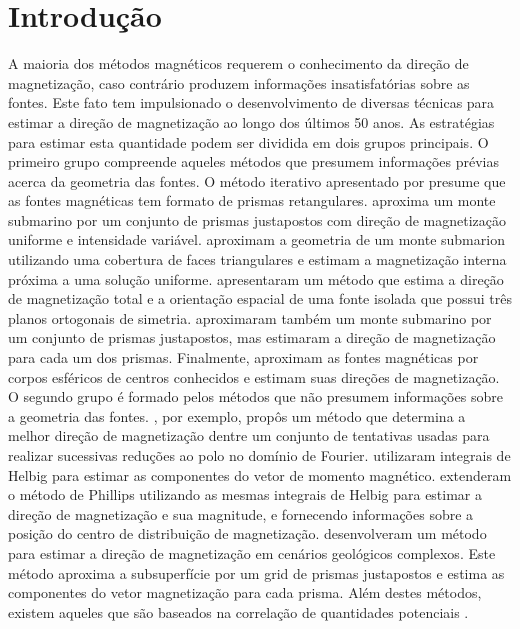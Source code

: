 \chapter{Introdução}
\label{chap:introducao}

A maioria dos métodos magnéticos requerem o conhecimento da direção de magnetização, caso contrário produzem informações insatisfatórias sobre as fontes. Este fato tem impulsionado o desenvolvimento de diversas técnicas para estimar a direção de magnetização ao longo dos últimos 50 anos. As estratégias para estimar esta quantidade podem ser dividida em dois grupos principais. O primeiro grupo compreende aqueles métodos que presumem informações prévias acerca da geometria das fontes. O método iterativo apresentado por \cite{bhattacharyya1966} presume que as fontes magnéticas tem formato de prismas retangulares. \cite{emilia_massey_1974} aproxima um monte submarino por um conjunto de prismas justapostos com direção de magnetização uniforme e intensidade variável. \cite{parker_etal_1987} aproximam a geometria de um monte submarion utilizando uma cobertura de faces triangulares e estimam a magnetização interna próxima a uma solução uniforme. \cite{parker_etal_1987} apresentaram um método que estima a direção de magnetização total e a orientação espacial de uma fonte isolada que possui três planos ortogonais de simetria. \cite{kubota2005} aproximaram também um monte submarino por um conjunto de prismas justapostos, mas estimaram a direção de magnetização para cada um dos prismas. Finalmente, \cite{oliveirajr_etal_2015} aproximam as fontes magnéticas por corpos esféricos de centros conhecidos e estimam suas direções de magnetização. O segundo grupo é formado pelos métodos que não presumem informações sobre a geometria das fontes. \cite{fedi_etal_1994}, por exemplo, propôs um método que determina a melhor direção de magnetização dentre um conjunto de tentativas usadas para realizar sucessivas reduções ao polo no domínio de Fourier. \cite{phillips2005} utilizaram integrais de Helbig para estimar as componentes do vetor de momento magnético. \cite{tontini_pedersen_2008} extenderam o método de Phillips utilizando as mesmas integrais de Helbig para estimar a direção de magnetização e sua magnitude, e fornecendo informações sobre a posição do centro de distribuição de magnetização. \cite{lelievre_oldenburg_2009} desenvolveram um método para estimar a direção de magnetização em cenários geológicos complexos. Este método aproxima a subsuperfície por um grid de prismas justapostos e estima as componentes do vetor magnetização para cada prisma. Além destes métodos, existem aqueles que são baseados na correlação de quantidades potenciais \citep[e.g.,][]{dannemiller_li_2006,gerovska_etal_2009,liu_etal_2015,zhang_etal_2018}. 

